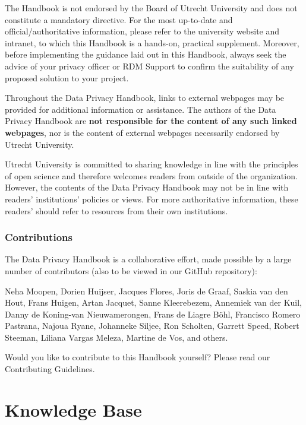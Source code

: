 \documentclass[
]{book}
\begin{document}
The Handbook is not endorsed by the Board of Utrecht University and does not constitute a mandatory directive.
For the most up-to-date and official/authoritative information, please refer to the
university website and
intranet, to which this Handbook is
a hands-on, practical supplement. Moreover, before implementing the guidance laid out in this Handbook, always seek
the advice of your privacy officer or RDM Support to confirm the suitability of any proposed solution to your project.

Throughout the Data Privacy Handbook, links to external webpages may be provided for additional information or assistance.
The authors of the Data Privacy Handbook are \textbf{not responsible for the content of any such linked webpages}, nor is the
content of external webpages necessarily endorsed by Utrecht University.

Utrecht University is committed to sharing knowledge in line with the principles of open science and therefore welcomes
readers from outside of the organization. However, the contents of the Data Privacy Handbook may not be in line with readers'
institutions' policies or views. For more authoritative information, these readers' should refer to resources from their own
institutions.

\hypertarget{contributions}{%
\section{Contributions}\label{contributions}}

The Data Privacy Handbook is a collaborative effort, made possible by a large number of contributors (also to be viewed
in our GitHub repository):

Neha Moopen, Dorien Huijser, Jacques Flores, Joris de Graaf, Saskia van den Hout, Frans Huigen, Artan Jacquet, Sanne Kleerebezem, Annemiek van der Kuil, Danny de Koning-van Nieuwamerongen, Frans de Liagre Böhl, Francisco Romero Pastrana, Najoua Ryane, Johanneke Siljee, Ron Scholten, Garrett Speed, Robert Steeman, Liliana Vargas Meleza, Martine de Vos, and others.

Would you like to contribute to this Handbook yourself? Please read our
Contributing Guidelines.

\hypertarget{part-knowledge-base}{%
\part{Knowledge Base}\label{part-knowledge-base}}
\end{document}
